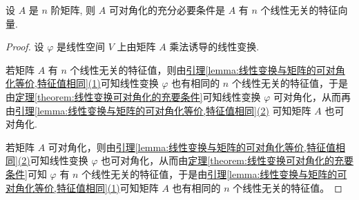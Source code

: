 \documentclass[../../main.tex]{subfiles}%
\begin{document}
\begin{theorem}[矩阵可对角化的充要条件]\label{theorem:矩阵可对角化的充要条件}
设 $A$ 是 $n$ 阶矩阵, 则 $A$ 可对角化的充分必要条件是 $A$ 有 $n$ 个线性无关的特征向量.
\end{theorem}
\begin{proof}

设 $\varphi$ 是线性空间 $V$ 上由矩阵 $A$ 乘法诱导的线性变换.

若矩阵 $A$ 有 $n$ 个线性无关的特征值，则由\hyperref[lemma:线性变换与矩阵的可对角化等价,特征值相同]{引理\ref{lemma:线性变换与矩阵的可对角化等价,特征值相同}(1)}可知线性变换 $\varphi$ 也有相同的 $n$ 个线性无关的特征值，于是由\hyperref[theorem:线性变换可对角化的充要条件]{定理\ref{theorem:线性变换可对角化的充要条件}}可知线性变换 $\varphi$ 可对角化，从而再由\hyperref[lemma:线性变换与矩阵的可对角化等价,特征值相同]{引理\ref{lemma:线性变换与矩阵的可对角化等价,特征值相同}(2)} 可知矩阵 $A$ 也可对角化.

若矩阵 $A$ 可对角化，则由\hyperref[lemma:线性变换与矩阵的可对角化等价,特征值相同]{引理\ref{lemma:线性变换与矩阵的可对角化等价,特征值相同}(2)}可知线性变换 $\varphi$ 也可对角化，从而由\hyperref[theorem:线性变换可对角化的充要条件]{定理\ref{theorem:线性变换可对角化的充要条件}}可知 $\varphi$ 有 $n$ 个线性无关的特征值，于是由\hyperref[lemma:线性变换与矩阵的可对角化等价,特征值相同]{引理\ref{lemma:线性变换与矩阵的可对角化等价,特征值相同}(1)}可知矩阵 $A$ 也有相同的 $n$ 个线性无关的特征值。

\end{proof}
\end{document}
